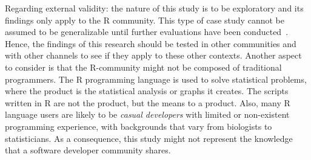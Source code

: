 Regarding external validity: the nature of this study is to be exploratory and its findings only apply to the R community.
This type of case study cannot be assumed to be generalizable until further evaluations have been conducted~\cite{Yin2009}.
    Hence, the findings of this research should be tested in other communities and with other channels to see if they apply to these other contexts.
Another aspect to consider is that the R-community might not be composed of traditional programmers.
    The R programming language is used to solve statistical problems, where the product is the statistical analysis or graphs it creates. The scripts written in
    R are not the product, but the means to a product.
    Also, many R language users are likely to be \textit{casual developers} with limited or non-existent programming experience, with backgrounds that vary from
    biologists to statisticians. As a consequence, this study might not represent the knowledge that a software developer community shares. 

